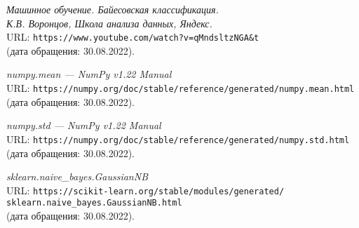 \begin{thebibliography}{99}
{\itshape Машинное обучение. Байесовская классификация.\\К.В. Воронцов, Школа анализа данных, Яндекс.}\\
URL: \texttt{https://www.youtube.com/watch?v=qMndsltzNGA\&t}\\
(дата обращения: 30.08.2022).

{\itshape numpy.mean --- NumPy v1.22 Manual}\\
URL: \texttt{https://numpy.org/doc/stable/reference/generated/numpy.mean.html}\\
(дата обращения: 30.08.2022).

{\itshape numpy.std --- NumPy v1.22 Manual}\\
URL: \texttt{https://numpy.org/doc/stable/reference/generated/numpy.std.html}\\
(дата обращения: 30.08.2022).

{\itshape sklearn.naive\_bayes.GaussianNB}\\
URL: \texttt{https://scikit-learn.org/stable/modules/generated/\\sklearn.naive\_bayes.GaussianNB.html}\\
(дата обращения: 30.08.2022).

\end{thebibliography}
\pagebreak
